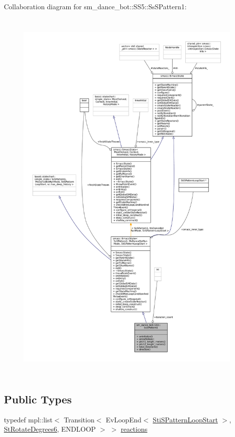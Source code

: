 Collaboration diagram for sm\+\_\+dance\+\_\+bot\+:\+:S\+S5\+:\+:Ss\+S\+Pattern1\+:
\nopagebreak
\begin{figure}[H]
\begin{center}
\leavevmode
\includegraphics[height=550pt]{structsm__dance__bot_1_1SS5_1_1SsSPattern1__coll__graph}
\end{center}
\end{figure}
\subsection*{Public Types}
\begin{DoxyCompactItemize}
\item 
typedef mpl\+::list$<$ Transition$<$ Ev\+Loop\+End$<$ \hyperlink{structsm__dance__bot_1_1s__pattern__states_1_1StiSPatternLoopStart}{Sti\+S\+Pattern\+Loop\+Start} $>$, \hyperlink{structsm__dance__bot_1_1StRotateDegrees6}{St\+Rotate\+Degrees6}, E\+N\+D\+L\+O\+OP $>$ $>$ \hyperlink{structsm__dance__bot_1_1SS5_1_1SsSPattern1_a6c5b86a52543caf627a571c543f6eda8}{reactions}
\end{DoxyCompactItemize}
